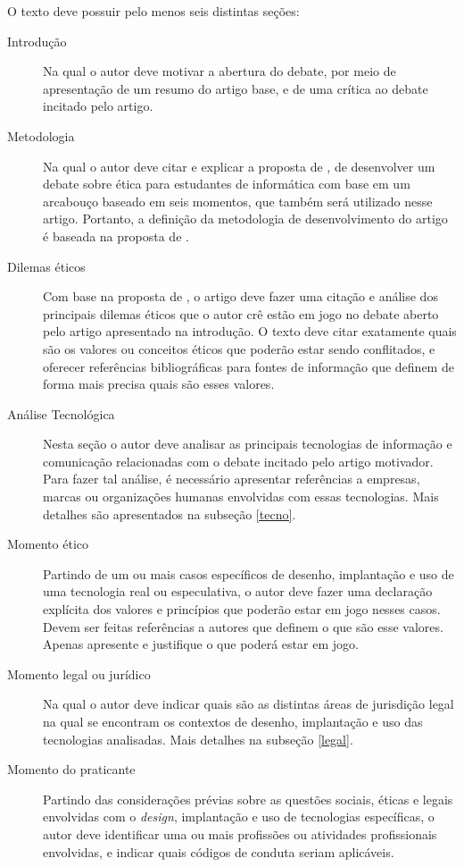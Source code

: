 \documentclass[12pt]{article}
\begin{document}
	O texto deve possuir pelo menos seis distintas seções:
	\begin{description}
		\item [Introdução] Na qual o autor deve motivar a abertura do debate, por meio de apresentação de um resumo do artigo base, e de uma crítica ao debate incitado pelo artigo.
		\item [Metodologia] Na qual o autor deve citar e explicar a proposta de \citet{jones_doing_2016}, de desenvolver um debate sobre ética para estudantes de informática com base em um arcabouço baseado em seis momentos, que também será utilizado nesse artigo. Portanto, a definição da metodologia de desenvolvimento do artigo é baseada na proposta de \citet{jones_doing_2016}.
		\item [Dilemas éticos] Com base na proposta de \citet{jones_doing_2016}, o artigo deve fazer uma citação e análise dos principais dilemas éticos que o autor crê estão em jogo no debate aberto pelo artigo apresentado na introdução. O texto deve citar exatamente quais são os valores ou conceitos éticos que poderão estar sendo conflitados, e oferecer referências bibliográficas para fontes de informação que definem de forma mais precisa quais são esses valores.
		\item [Análise Tecnológica] Nesta seção o autor deve analisar as principais tecnologias de informação e comunicação relacionadas com o debate incitado pelo artigo motivador. Para fazer tal análise, é necessário apresentar referências a empresas, marcas ou organizações humanas envolvidas com essas tecnologias. Mais detalhes são apresentados na subseção \ref{tecno}.
		\item [Momento ético] Partindo de um ou mais casos específicos de desenho, implantação e uso de uma tecnologia real ou especulativa, o autor deve fazer uma declaração explícita dos valores e princípios que poderão estar em jogo nesses casos. Devem ser feitas referências a autores que definem o que são esse valores. Apenas apresente e justifique o que poderá estar em jogo.
		\item [Momento legal ou jurídico] Na qual o autor deve indicar quais são as distintas áreas de jurisdição legal na qual se encontram os contextos de desenho, implantação e uso das tecnologias analisadas.
		Mais detalhes na subseção \ref{legal}.
		\item [Momento do praticante]
		Partindo das considerações prévias sobre as questões sociais, éticas e legais envolvidas com o \textit{design}, implantação e uso de tecnologias específicas, o autor deve identificar uma ou mais profissões ou atividades profissionais envolvidas, e indicar quais códigos de conduta seriam aplicáveis.


\end{description}
\end{document}
